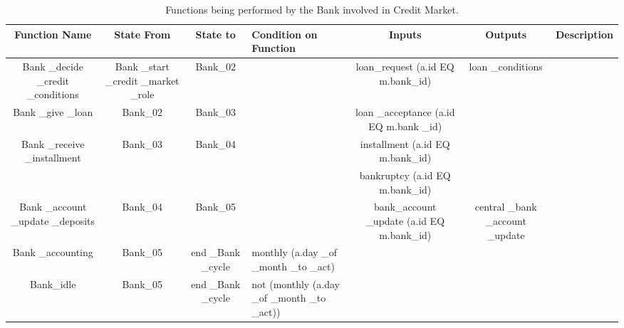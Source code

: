 \begin{landscape}
\begin{table}[!htb]\caption{Functions being performed by the Bank involved in Credit Market.}
\begin{center}
\begin{tabular}{|c|c|c|l|c|c|l|}
\hline
Function Name & State From & State to & Condition on Function & Inputs & Outputs & Description \\
\hline

{\parbox[l]{3cm}{Bank \_decide \_credit \_conditions}} &
{\parbox[l]{3cm}{Bank \_start \_credit \_market \_role}} & Bank\_02
& & {\parbox[l]{3cm}{loan\_request (a.id EQ m.bank\_id)}} &
{\parbox[l]{3cm}{loan \_conditions}} &\\

\hline

{\parbox[l]{3cm}{Bank \_give \_loan}} & Bank\_02 & Bank\_03 & &
{\parbox[l]{3cm}{loan \_acceptance (a.id EQ m.bank \_id)}} &  &\\

\hline

{\parbox[l]{3cm}{Bank \_receive \_installment}} & Bank\_03 &
Bank\_04 & &
{\parbox[l]{3cm}{installment (a.id EQ m.bank\_id)}} & & \\

&&&&
{\parbox[l]{3cm}{bankruptcy (a.id EQ m.bank\_id)}} &  &\\

\hline


{\parbox[l]{3cm}{Bank \_account \_update \_deposits}} & Bank\_04 &
Bank\_05 & & {\parbox[l]{3cm}{bank\_account \_update (a.id EQ
m.bank\_id)}} &
{\parbox[l]{3cm}{central \_bank \_account \_update}} &\\

\hline


{\parbox[l]{3cm}{Bank \_accounting}} & Bank\_05 &
{\parbox[l]{3cm}{end \_Bank \_cycle}} &
{\parbox[l]{4cm}{monthly (a.day \_of \_month \_to \_act)}}&  &  &\\

\hline


{\parbox[l]{3cm}{Bank\_idle}} & Bank\_05 & {\parbox[l]{3cm}{end
\_Bank \_cycle}} &
{\parbox[l]{4cm}{not (monthly (a.day \_of \_month \_to \_act))}}&  &  &\\
\hline


\end{tabular}\end{center}\label{tab:creditbankfn}
\end{table}
\end{landscape}

